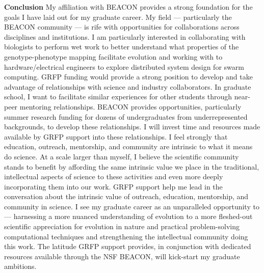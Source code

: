 \textbf{Conclusion}
My affiliation with BEACON provides a strong foundation for the goals I have laid out for my graduate career.
My field --- particularly the BEACON community --- is rife with opportunities for collaborations across disciplines and institutions.
I am particularly interested in collaborating with biologists to perform wet work to better understand what properties of the genotype-phenotype mapping facilitate evolution and working with to hardware/electrical engineers to explore distributed system design for swarm computing.
GRFP funding would provide a strong position to develop and take advantage of relationships with science and industry collaborators.
In graduate school, I want to facilitate similar experiences for other students through near-peer mentoring relationships.
BEACON provides opportunities, particularly summer research funding for dozens of undergraduates from underrepresented backgrounds, to develop these relationships.
I will invest time and resources made available by GRFP support into these relationships.
I feel strongly that education, outreach, mentorship, and community are intrinsic to what it means do science.
At a scale larger than myself, I believe the scientific community stands to benefit by affording the same intrinsic value we place in the traditional, intellectual aspects of science to these activities and even more deeply incorporating them into our work.
GRFP support help me lead in the conversation about the intrinsic value of outreach, education, mentorship, and community in science.
I see my graduate career as an unparalleled opportunity to --- harnessing a more nuanced understanding of evolution to a more fleshed-out scientific appreciation for evolution in nature and practical problem-solving computational techniques and strengthening the intellectual community doing this work.
The latitude GRFP support provides, in conjunction with dedicated resources available through the NSF BEACON, will kick-start my graduate ambitions.
